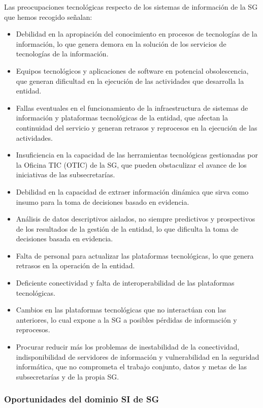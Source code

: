 \documentclass[
	a4paper, %
	12pt, %
]{include/CSSullivanBusinessReport}
\def\tightlist{}
\begin{document}
Las preocupaciones tecnológicas respecto de los sistemas de información
de la SG que hemos recogido señalan:

\begin{itemize}
\tightlist
\item
  Debilidad en la apropiación del conocimiento en procesos de
  tecnologías de la información, lo que genera demora en la solución de
  los servicios de tecnologías de la información.
\item
  Equipos tecnológicos y aplicaciones de software en potencial
  obsolescencia, que generan dificultad en la ejecución de las
  actividades que desarrolla la entidad.
\item
  Fallas eventuales en el funcionamiento de la infraestructura de
  sistemas de información y plataformas tecnológicas de la entidad, que
  afectan la continuidad del servicio y generan retrasos y reprocesos en
  la ejecución de las actividades.
\item
  Insuficiencia en la capacidad de las herramientas tecnológicas
  gestionadas por la Oficina TIC (OTIC) de la SG, que pueden
  obstaculizar el avance de los iniciativas de las subsecretarías.
\item
  Debilidad en la capacidad de extraer información dinámica que sirva
  como insumo para la toma de decisiones basado en evidencia.
\item
  Análisis de datos descriptivos aislados, no siempre predictivos y
  prospectivos de los resultados de la gestión de la entidad, lo que
  dificulta la toma de decisiones basada en evidencia.
\item
  Falta de personal para actualizar las plataformas tecnológicas, lo que
  genera retrasos en la operación de la entidad.
\item
  Deficiente conectividad y falta de interoperabilidad de las
  plataformas tecnológicas.
\item
  Cambios en las plataformas tecnológicas que no interactúan con las
  anteriores, lo cual expone a la SG a posibles pérdidas de información
  y reprocesos.
\item
  Procurar reducir más los problemas de inestabilidad de la
  conectividad, indisponibilidad de servidores de información y
  vulnerabilidad en la seguridad informática, que no comprometa el
  trabajo conjunto, datos y metas de las subsecretarías y de la propia
  SG.
\end{itemize}

\subsubsection{Oportunidades del dominio SI de
SG}\label{sec:oportunidades-del-dominio-si-de-sg}
\end{document}
